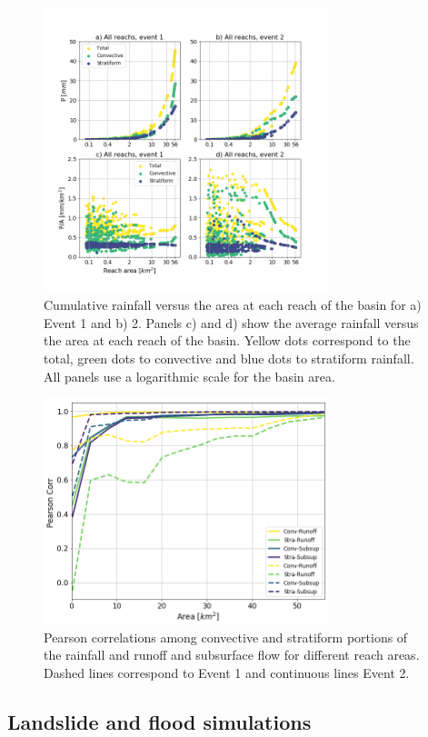 \documentclass[hess, manuscript]{copernicus}
\begin{document}
\begin{figure}[t]
\centering
 \includegraphics[width=8.3cm]{Figures/RainAcum_by_reach.png}
 \caption{Cumulative rainfall versus the area at each reach of the basin for a) Event 1 and b) 2. Panels c) and d) show the average rainfall versus the area at each reach of the basin. Yellow dots correspond to the total, green dots to convective and blue dots to stratiform rainfall. All panels use a logarithmic scale for the basin area.}
    \label{fig:RainAcumByReach}
\end{figure}

\begin{figure}[t]
\centering
 \includegraphics[width=8.3cm]{Figures/CorrPearson_TipoRain_Fluxes.png}
 \caption{Pearson correlations among convective and stratiform portions of the rainfall and runoff and subsurface flow for different reach areas. Dashed lines correspond to Event 1 and continuous lines Event 2.}
    \label{fig:PearsonCorr}
\end{figure}


\subsection{Landslide and flood simulations}
\end{document}
